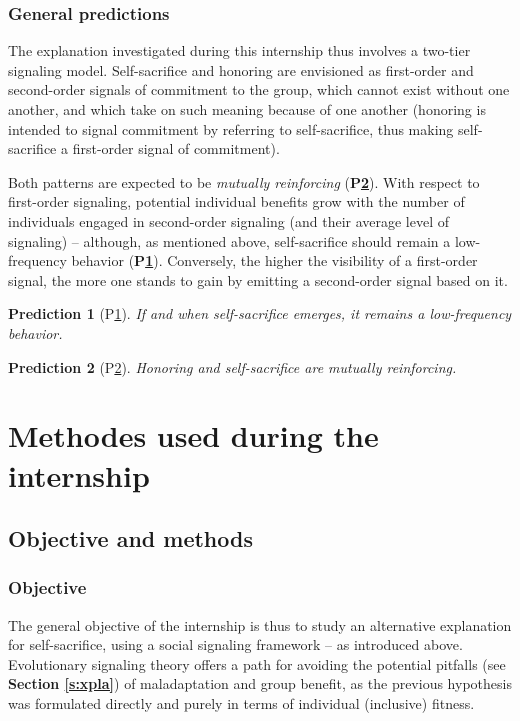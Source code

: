 \documentclass[a4paper,12pt]{report}
\newtheorem{predict}{Prediction}
\begin{document}
\subsection{General predictions}
\label{s:predictions}
The explanation investigated during this internship thus involves a 
two-tier signaling model. Self-sacrifice and honoring are envisioned 
as first-order and second-order signals of commitment to the group, 
which cannot exist without one another, and which take on such meaning 
because of one another (honoring is intended to signal commitment by 
referring to self-sacrifice, thus making self-sacrifice a first-order 
signal of commitment). 

Both patterns are expected to be \emph{mutually reinforcing} (\textbf{P\ref{p:reinforce}}). 
With respect to first-order signaling, potential individual 
benefits grow with the number of individuals engaged in second-order 
signaling (and their average level of signaling) – although, as mentioned above,
self-sacrifice should remain a low-frequency behavior (\textbf{P\ref{p:low_freq}}). Conversely, the higher 
the visibility of a first-order signal, the more one stands to gain by emitting
a second-order signal based on it.

\begin{predict}[P\ref{p:low_freq}]
    \label{p:low_freq}
    If and when self-sacrifice emerges, it remains a low-frequency behavior.
\end{predict}

\begin{predict}[P\ref{p:reinforce}]
    \label{p:reinforce}
    Honoring and self-sacrifice are mutually reinforcing.
\end{predict}



\chapter{Methodes used during the internship}
\section{Objective and methods}
\subsection{Objective}
\label{s:objective}
The general objective of the internship is thus to study an alternative explanation
for self-sacrifice, using a social signaling framework – as introduced above.
Evolutionary signaling theory offers a path for avoiding the potential pitfalls
(see \textbf{Section \ref{s:xpla}}) of maladaptation
and group benefit, as the previous hypothesis
was formulated directly and purely in terms of individual (inclusive) fitness.
\end{document}
